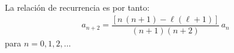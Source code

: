 La relación de recurrencia es por tanto:
\begin{align}
a_{n+2} = \dfrac{[n \, (n + 1)- \ell (\ell + 1)]}{(n + 1)(n + 2)} \, a_{n}
\label{eq:ecuacion_18_02}
\end{align}
para $n = 0, 1, 2, \ldots$
